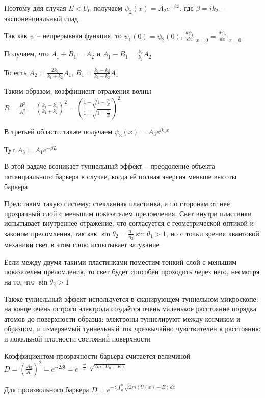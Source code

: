 \documentclass[12pt]{article}
\begin{document}
Поэтому для случая $E < U_0$ получаем $\psi_2(x) = A_2 e^{-\beta x}$, где $\beta = i k_2$ -- экспоненциальный спад

Так как $\psi$ -- непрерывная функция, то $\psi_1(0) = \psi_2(0)$, $\frac{d \psi_1}{dx} \Big|_{x = 0} = \frac{d \psi_2}{dx} \Big|_{x = 0}$

Получаем, что $A_1 + B_1 = A_2$ и $A_1 - B_1 = \frac{k_2}{k_1} A_2$

То есть $A_2 = \frac{2k_1}{k_1 + k_2} A_1$, $B_1 = \frac{k_1 - k_2}{k_1 + k_2} A_1$

Таким образом, коэффициент отражения волны $R = \frac{B^2_1}{A^2_1} = \left(\frac{k_1 - k_2}{k_1 + k_2}\right)^2 = \left(\frac{1 - \sqrt{1 - \frac{U_0}{E}}}{1 + \sqrt{1 - \frac{U_0}{E}}}\right)^2$

\mediumvspace

В третьей области также получаем $\psi_3(x) = A_3 e^{i k_1 x}$

Тут $A_3 = A_1 e^{-\beta L}$

\mediumvspace

В этой задаче возникает туннельный эффект -- преодоление объекта потенциального барьера в случае, когда её полная энергия меньше высоты барьера

Представим такую систему: стеклянная пластинка, а по сторонам от нее прозрачный слой с меньшим показателем преломления. Свет внутри пластинки испытывает внутреннее отражение, что согласуется с геометрической оптикой и законом преломления, так как $\sin \theta_2 = \frac{n_1}{n_2} \sin \theta_1 > 1$, но с точки зрения квантовой механики свет в этом слою испытывает затухание

Если между двумя такими пластинками поместим тонкий слой с меньшим показателем преломления, то свет будет способен проходить через него, несмотря на то, что $\sin \theta_2 > 1$


Также туннельный эффект используется в сканирующем туннельном микроскопе: на конце очень острого электрода создаётся очень маленькое расстояние порядка атомов до поверхности образца: электроны туннелируют между кончиком и образцом, и измеряемый туннельный ток чрезвычайно чувствителен к расстоянию и локальной плотности состояний поверхности

\mediumvspace

Коэффициентом прозрачности барьера считается величиной $D = \left(\frac{A_3}{A_1}\right)^2 = e^{-2\beta l} = e^{-\frac{2 l}{\hbar} \cdot \sqrt{2m(U_0 - E)}}$

Для произвольного барьера $D = e^{-\frac{2}{h} \int_a^b \sqrt{2m (U(x) - E)} dx}$
\end{document}

